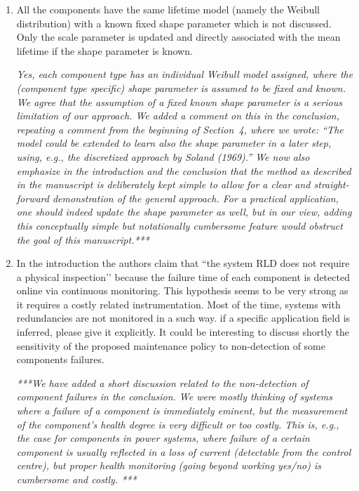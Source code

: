 \documentclass[authoryear]{elsarticle}
\begin{document}
\begin{enumerate}
\item All the components have the same lifetime model (namely the Weibull distribution) with a known fixed shape parameter which is not discussed. Only the scale parameter is updated and directly associated with the mean lifetime if the shape parameter is known.

\smallskip

\emph{Yes, each component type has an individual Weibull model assigned,
where the (component type specific) shape parameter is assumed to be fixed and known.
We agree that the assumption of a fixed known shape parameter is a serious limitation of our approach. 
We added a comment on this in the conclusion,
repeating a comment from the beginning of Section~4, where we wrote:
``The model could be extended to learn also the shape parameter in a later step,
using, e.g., the discretized approach by Soland (1969).''
We now also emphasize in the introduction and the conclusion that the method as described in the manuscript is deliberately kept simple
to allow for a clear and straight-forward demonstration of the general approach.
For a practical application, one should indeed update the shape parameter as well,
but in our view, adding this conceptually simple but notationally cumbersome feature would obstruct the goal of this manuscript.***}

\item In the introduction the authors claim that ``the system RLD does not require a physical inspection’’ because the failure time of each component is detected online via continuous monitoring. This hypothesis seems to be very strong as it requires a costly related instrumentation. Most of the time, systems with redundancies are not monitored in a such way. if a specific application field is inferred, please give it explicitly. It could be interesting to discuss shortly the sensitivity of the proposed maintenance policy to non-detection of some components failures. 

\smallskip

\emph{***We have added a short discussion related to the non-detection of component failures in the conclusion.
We were mostly thinking of systems where a failure of a component is immediately eminent,
but the measurement of the component's health degree is very difficult or too costly.
This is, e.g., the case for components in power systems, where failure of a certain component
is usually reflected in a loss of current (detectable from the control centre),
but proper health monitoring (going beyond working yes/no) is cumbersome and costly.
***}


\end{enumerate}
\end{document}
